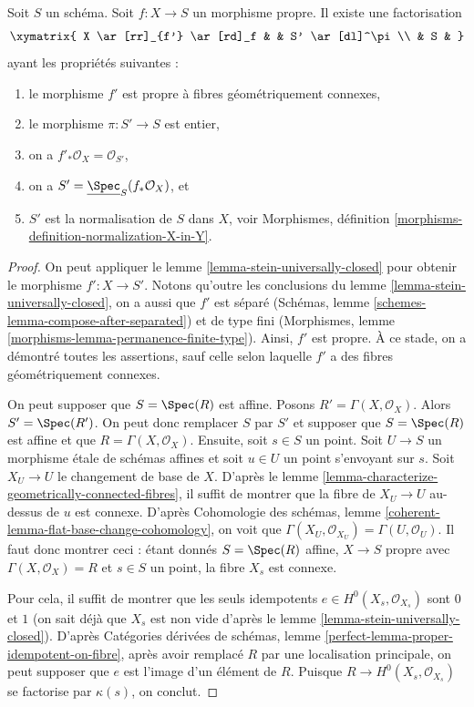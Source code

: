 \begin{theorem}
\label{theorem-stein-factorization-general}
Soit $S$ un schéma.
Soit $f : X \to S$ un morphisme propre.
Il existe une factorisation
$$
\xymatrix{
X \ar[rr]_{f'} \ar[rd]_f & & S' \ar[dl]^\pi \\
& S &
}
$$
ayant les propriétés suivantes :
\begin{enumerate}
\item le morphisme $f'$ est propre à fibres géométriquement connexes,
\item le morphisme $\pi : S' \to S$ est entier,
\item on a $f'_*\mathcal{O}_X = \mathcal{O}_{S'}$,
\item on a $S' = \underline{\Spec}_S(f_*\mathcal{O}_X)$, et
\item $S'$ est la normalisation de $S$ dans $X$, voir
Morphismes, définition \ref{morphisms-definition-normalization-X-in-Y}.
\end{enumerate}
\end{theorem}

\begin{proof}
On peut appliquer le lemme \ref{lemma-stein-universally-closed} pour obtenir le
morphisme $f' : X \to S'$.
Notons qu'outre les
conclusions du lemme \ref{lemma-stein-universally-closed}, on
a aussi que $f'$ est séparé
(Schémas, lemme \ref{schemes-lemma-compose-after-separated})
et de type fini
(Morphismes, lemme \ref{morphisms-lemma-permanence-finite-type}).
Ainsi, $f'$ est propre. À ce stade, on a démontré toutes les
assertions, sauf celle selon laquelle
$f'$ a des fibres géométriquement connexes.

\medskip\noindent
On peut supposer que $S = \Spec(R)$ est affine.
Posons $R' = \Gamma(X, \mathcal{O}_X)$. Alors $S' = \Spec(R')$.
On peut donc remplacer $S$ par $S'$ et supposer que
$S = \Spec(R)$ est affine et que $R = \Gamma(X, \mathcal{O}_X)$.
Ensuite, soit $s \in S$ un point. Soit $U \to S$ un morphisme \'etale
de schémas affines et soit $u \in U$ un point s'envoyant sur $s$.
Soit $X_U \to U$ le changement de base de $X$. D'après
le lemme \ref{lemma-characterize-geometrically-connected-fibres},
il suffit de montrer que la fibre de $X_U \to U$ au-dessus de $u$ est
connexe. D'après
Cohomologie des schémas, lemme \ref{coherent-lemma-flat-base-change-cohomology},
on voit que
$\Gamma(X_U, \mathcal{O}_{X_U}) = \Gamma(U, \mathcal{O}_U)$.
Il faut donc montrer ceci : étant donnés
$S = \Spec(R)$ affine, $X \to S$ propre avec $\Gamma(X, \mathcal{O}_X) = R$
et $s \in S$ un point, la fibre $X_s$ est connexe.

\medskip\noindent
Pour cela, il suffit de montrer que les seuls idempotents
$e \in H^0(X_s, \mathcal{O}_{X_s})$ sont $0$ et $1$ (on sait déjà
que $X_s$ est non vide d'après le lemme \ref{lemma-stein-universally-closed}).
D'après Catégories dérivées de schémas, lemme
\ref{perfect-lemma-proper-idempotent-on-fibre},
après avoir remplacé $R$ par une localisation principale,
on peut supposer que $e$ est l'image d'un élément de $R$.
Puisque $R \to H^0(X_s, \mathcal{O}_{X_s})$ se factorise par
$\kappa(s)$, on conclut.
\end{proof}

